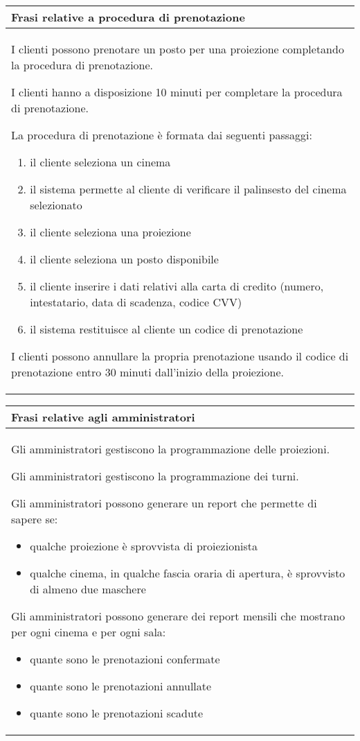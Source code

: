 \begin{tabularx}{\linewidth}{|X|}
    \hline
    \rowcolor{tblhdrcolor}
    \textbf{Frasi relative a procedura di prenotazione} \\\hline
    I clienti possono prenotare un posto per una proiezione
    completando la procedura di prenotazione.
    
    I clienti hanno a disposizione 10 minuti per completare la
    procedura di prenotazione.
    
    La procedura di prenotazione è formata dai seguenti passaggi:
    \begin{enumerate}
        \item il cliente seleziona un cinema
        \item il sistema permette al cliente di verificare
              il palinsesto del cinema selezionato
        \item il cliente seleziona una proiezione
        \item il cliente seleziona un posto disponibile
        \item il cliente inserire i dati relativi alla carta
              di credito (numero, intestatario, data di scadenza,
              codice CVV)
        \item il sistema restituisce al cliente un codice di
              prenotazione
    \end{enumerate}
    
    I clienti possono annullare la propria prenotazione usando il
    codice di prenotazione entro 30 minuti dall'inizio della
    proiezione.
    \\ \hline
\end{tabularx}

\begin{tabularx}{\linewidth}{|X|}
    \hline
    \rowcolor{tblhdrcolor}
    \textbf{Frasi relative agli amministratori} \\\hline
    Gli amministratori gestiscono la programmazione delle proiezioni.
    
    Gli amministratori gestiscono la programmazione dei turni.
    
    Gli amministratori possono generare un report che permette di
    sapere se:
    \begin{itemize}
        \item qualche proiezione è sprovvista di proiezionista
        \item qualche cinema, in qualche fascia oraria di apertura,
              è sprovvisto di almeno due maschere
    \end{itemize}
    
    Gli amministratori possono generare dei report mensili che
    mostrano per ogni cinema e per ogni sala:
    \begin{itemize}
        \item quante sono le prenotazioni confermate
        \item quante sono le prenotazioni annullate
        \item quante sono le prenotazioni scadute
    \end{itemize}
    \\ \hline
\end{tabularx}

